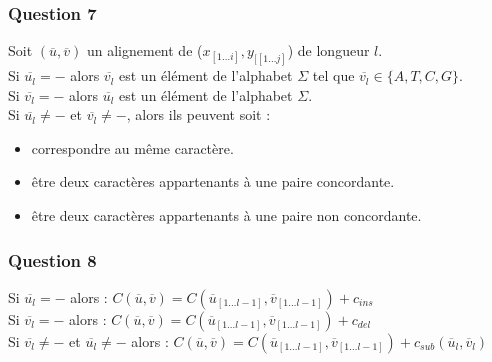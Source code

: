\documentclass[12pt, a4paper]{report}
\begin{document}
\subsubsection{Question 7}
Soit $(\overline{u},\overline{v})$ un alignement de ($x_{\left[ 1 \dots i \right ]},y_{[\left [ 1 \dots j \right ]}$) de longueur $l$.\\ 
Si $\overline{u_{l}}=-$ alors $\overline{v_{l}}$ est un élément de l'alphabet $\Sigma$ tel que $\overline{v_{l}} \in \{ A,T,C,G \}$.\\
Si $\overline{v_{l}}=-$ alors $\overline{u_{l}}$ est un élément de l'alphabet $\Sigma$.\\
Si $\overline{u_{l}}\neq-$ et $\overline{v_{l}}\neq-$, alors ils peuvent soit :
\begin{itemize}
\item correspondre au même caractère.
\item être deux caractères appartenants à une paire concordante.
\item être deux caractères appartenants à une paire non concordante.
\end{itemize}

\subsubsection{Question 8}
Si $\overline{u_{l}}=-$ alors : $C(\overline{u},\overline{v})=C(\overline{u}_{\left [ 1 \dots l-1 \right ]},\overline{v}_{\left [ 1 \dots l-1 \right ]})+c_{ins}$\\
Si $\overline{v_{l}}=-$ alors : $C(\overline{u},\overline{v})=C(\overline{u}_{\left [ 1 \dots l-1 \right ]},\overline{v}_{\left [ 1 \dots l-1 \right ]})+c_{del}$\\
Si $\overline{v_{l}}\neq-$ et $\overline{u_{l}}\neq-$ alors : $C(\overline{u},\overline{v})=C(\overline{u}_{\left [ 1 \dots l-1 \right ]},\overline{v}_{\left [ 1 \dots l-1 \right ]})+c_{sub}(\overline{u}_{l},\overline{v}_{l})$
\end{document}
